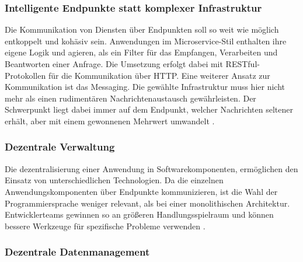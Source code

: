 \subsubsection{Intelligente Endpunkte statt komplexer Infrastruktur}
Die Kommunikation von Diensten über Endpunkten soll so weit wie möglich entkoppelt und kohäsiv sein.  
Anwendungen im Microservice-Stil enthalten ihre eigene Logik und agieren, als ein Filter für das Empfangen, Verarbeiten und Beantworten einer Anfrage. 
Die Umsetzung erfolgt dabei mit RESTful-Protokollen für die Kommunikation über HTTP. 
Eine weiterer Ansatz zur Kommunikation ist das Messaging.
Die gewählte Infrastruktur muss hier nicht mehr als einen rudimentären Nachrichtenaustausch gewährleisten. 
Der Schwerpunkt liegt dabei immer auf dem Endpunkt, welcher Nachrichten seltener erhält, aber mit einem gewonnenen Mehrwert umwandelt \cite{FowlerMicroservice}.

\subsubsection{Dezentrale Verwaltung}
Die dezentralisierung einer Anwendung in Softwarekomponenten, ermöglichen den Einsatz von unterschiedlichen Technologien. 
Da die einzelnen Anwendungskomponenten über Endpunkte kommunizieren, ist die Wahl der Programmiersprache weniger relevant, als bei einer monolithischen Architektur. 
Entwicklerteams gewinnen so an größeren Handlungsspielraum und können bessere Werkzeuge für spezifische Probleme verwenden \cite{FowlerMicroservice}.

\subsubsection{Dezentrale Datenmanagement}